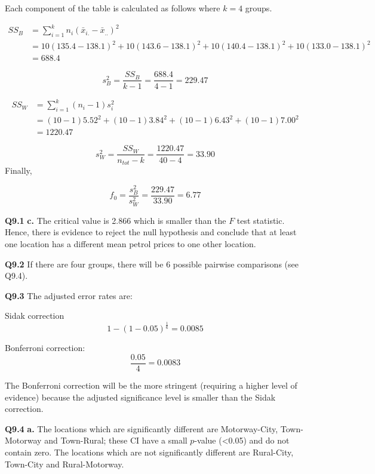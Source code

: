 \documentclass[
  oneside]{krantz}
\begin{document}
Each component of the table is calculated as follows where \(k = 4\) groups.

\begin{equation}\label{}
\begin{split}
SS_B & = \sum_{i=1}^{k} n_i (\bar{x}_{i.}-\bar{x}_{..})^2 \\
& = 10(135.4 - 138.1)^2 + 10(143.6 - 138.1)^2 + 10(140.4 - 138.1)^2 + 10(133.0 - 138.1)^2\\
& = 688.4
\end{split}
\end{equation}

\[s^2_B = \frac{SS_B}{k-1} = \frac{688.4}{4-1} = 229.47\]

\begin{equation}
\begin{split}
SS_W & = \sum_{i=1}^{k}(n_i-1)s_i^2 \\
& = (10-1)5.52^2 + (10-1)3.84^2 + (10-1)6.43^2 + (10-1)7.00^2\\
& = 1220.47
\end{split}
\end{equation}

\[s^2_W = \frac{SS_W}{n_{tot}-k} = \frac{1220.47}{40 - 4} = 33.90\]
Finally,

\[f_0 = \frac{s^2_B}{s^2_W} = \frac{229.47}{33.90} = 6.77\]

\textbf{Q9.1} \textbf{c.} The critical value is 2.866 which is smaller than the \(F\) test statistic. Hence, there is evidence to reject the null hypothesis and conclude that at least one location has a different mean petrol prices to one other location.

\textbf{Q9.2} If there are four groups, there will be 6 possible pairwise comparisons (see Q9.4).

\textbf{Q9.3} The adjusted error rates are:

Sidak correction
\[1 - (1 - 0.05)^{\frac{1}{6}} = 0.0085\]

Bonferroni correction:
\[\frac{0.05}{4} = 0.0083\]

The Bonferroni correction will be the more stringent (requiring a higher level of evidence) because the adjusted significance level is smaller than the Sidak correction.

\textbf{Q9.4} \textbf{a.} The locations which are significantly different are Motorway-City, Town-Motorway and Town-Rural; these CI have a small \(p\)-value (\textless0.05) and do not contain zero. The locations which are not significantly different are Rural-City, Town-City and Rural-Motorway.
\end{document}
